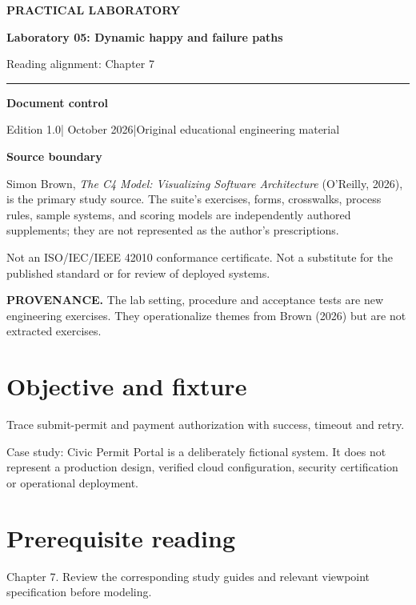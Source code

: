 \documentclass[10pt,letterpaper]{article}
\newcommand{\SourceNote}[1]{\par\smallskip\noindent\colorbox{C4Light}{\parbox{0.94\linewidth}{\footnotesize\textbf{PROVENANCE.} #1}}\par\medskip}
\newcommand{\DocStart}[3]{%
\begin{document}
\begin{titlepage}
\renewcommand{\thepage}{title-\arabic{page}}
\vspace*{0.55in}
{\sffamily\bfseries\small\color{C4Teal}#1}\par\vspace{0.24in}
{\sffamily\bfseries\fontsize{26}{31}\selectfont\color{C4Navy}#2}\par\vspace{0.18in}
{\large\color{C4Gray}#3}\par\vspace{0.4in}
\textcolor{C4Teal}{\rule{\linewidth}{1.15pt}}\par\vspace{0.24in}
\textbf{Document control}\par
Edition 1.0\quad|\quad 30 October 2026\quad|\quad Original educational engineering material\par
\vspace{0.17in}
\textbf{Source boundary}\par
Simon Brown, \emph{The C4 Model: Visualizing Software Architecture} (O'Reilly, 2026), is the primary study source. The suite's exercises, forms, crosswalks, process rules, sample systems, and scoring models are independently authored supplements; they are not represented as the author's prescriptions.\par
\vfill
{\small\color{C4Gray}Not an ISO/IEC/IEEE 42010 conformance certificate. Not a substitute for the published standard or for review of deployed systems.}\par
\end{titlepage}
}
\DocStart{PRACTICAL LABORATORY}{Laboratory 05: Dynamic happy and failure paths}{Reading alignment: Chapter 7}
\SourceNote{The lab setting, procedure and acceptance tests are new engineering exercises. They operationalize themes from Brown (2026) but are not extracted exercises.}
\section{Objective and fixture}
Trace submit-permit and payment authorization with success, timeout and retry.

Case study: Civic Permit Portal is a deliberately fictional system. It does not represent a production design, verified cloud configuration, security certification or operational deployment.


\section{Prerequisite reading}
Chapter 7. Review the corresponding study guides and relevant viewpoint specification before modeling.
\end{document}
